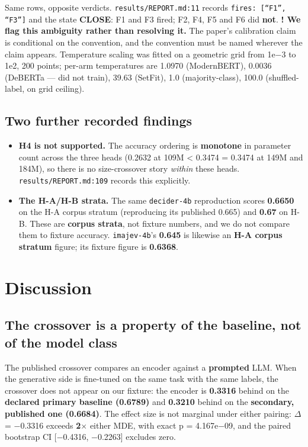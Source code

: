 \documentclass[10pt]{article}
\begin{document}
Same rows, opposite verdicts. \texttt{results/REPORT.md:11} records \texttt{fires: [``F1'', ``F3'']} and the state \textbf{CLOSE}: F1 and F3 fired; F2, F4, F5 and F6 did \textbf{not}. \textbf{! We flag this ambiguity rather than resolving it.} The paper's calibration claim is conditional on the convention, and the convention must be named wherever the claim appears. Temperature scaling was fitted on a geometric grid from 1e$-$3 to 1e2, 200 points; per-arm temperatures are 1.0970 (ModernBERT), 0.0036 (DeBERTa --- did not train), 39.63 (SetFit), 1.0 (majority-class), 100.0 (shuffled-label, on grid ceiling).

\subsection{Two further recorded findings}

\begin{itemize}
\item \textbf{H4 is not supported.} The accuracy ordering is \textbf{monotone} in parameter count across the three heads (0.2632 at 109M < 0.3474 = 0.3474 at 149M and 184M), so there is no size-crossover story \emph{within} these heads. \texttt{results/REPORT.md:109} records this explicitly.
\item \textbf{The H-A/H-B strata.} The same \texttt{decider-4b} reproduction scores \textbf{0.6650} on the H-A corpus stratum (reproducing its published 0.665) and \textbf{0.67} on H-B. These are \textbf{corpus strata}, not fixture numbers, and we do not compare them to fixture accuracy. \texttt{imajev-4b}'s \textbf{0.645} is likewise an \textbf{H-A corpus stratum} figure; its fixture figure is \textbf{0.6368}.
\end{itemize}

\section{Discussion}

\subsection{The crossover is a property of the baseline, not of the model class}

The published crossover compares an encoder against a \textbf{prompted} LLM. When the generative side is fine-tuned on the same task with the same labels, the crossover does not appear on our fixture: the encoder is \textbf{0.3316} behind on the \textbf{declared primary baseline (0.6789)} and \textbf{0.3210} behind on the \textbf{secondary, published one (0.6684)}. The effect size is not marginal under either pairing: $\Delta$ = $-$0.3316 exceeds \textbf{2$\times$} either MDE, with exact p = 4.167e$-$09, and the paired bootstrap CI [$-$0.4316, $-$0.2263] excludes zero.
\end{document}
